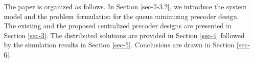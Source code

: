 The paper is organized as follows. In Section \ref{sec-2-3.2}, we introduce the system model and the problem formulation for the queue minimizing precoder design. The existing and the proposed centralized precoder designs are presented in Section \ref{sec-3}. The distributed solutions are provided in Section \ref{sec-4} followed by the simulation results in Section \ref{sec-5}. Conclusions are drawn in Section \ref{sec-6}.